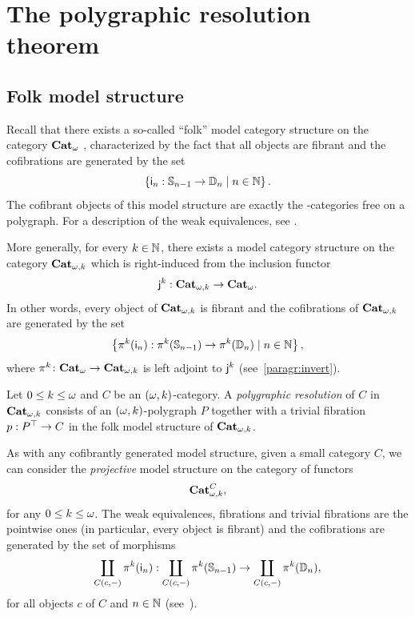 \section{The polygraphic resolution theorem}\label{sec:projresol}

\subsection{Folk model structure}
\begin{paragr}\label{paragr:folk}
  Recall that there exists a so-called ``folk'' model category
  structure on the category $\mathbf{Cat}_{\omega}$ \cite{lafontetal:folkms}, characterized by the fact that
  all objects are fibrant and the cofibrations are generated by the
  set 
  \[
    \left\{ \mathsf{i}_{n}:\mathbb{S}_{n-1} \to \mathbb{D}_{n} \; | \; n \in \mathbb N\right\}.
  \]
  The cofibrant objects of this model structure are exactly the
  \oo\nbd-categories free on a polygraph. For a description of the
  weak equivalences, see \cite[Theorem 6.19]{lafontetal:folkms}. 
\end{paragr}
\begin{paragr}
  More generally, for every $k \in \mathbb N$, there exists a model
  category structure on the category $\mathbf{Cat}_{\omega,k}$ \cite{ara_lucas:folmon} which is
  right-induced from the inclusion functor
  \[
    \mathsf{j}_{}^{k}:\mathbf{Cat}_{\omega,k} \to \mathbf{Cat}_{\omega}.
  \]
  In other words, every object of $\mathbf{Cat}_{\omega,k}$ is fibrant and the cofibrations of $\mathbf{Cat}_{\omega,k}$ are generated
  by the set 
  \[
    \left\{ \mathsf{\pi}_{}^{k}(\mathsf{i}_{n}):\mathsf{\pi}_{}^{k}(\mathbb{S}_{n-1}) \to \mathsf{\pi}_{}^{k}(\mathbb{D}_{n}) \; | \; n \in \mathbb N\right\},
  \]
  where $\mathsf{\pi}_{}^{k} \colon \mathbf{Cat}_{\omega} \to \mathbf{Cat}_{\omega,k}$ is left adjoint to
  $\mathsf{j}_{}^{k}$ (see~\cref{paragr:invert}).
\end{paragr}
\begin{definition}\label{def:respol}
  Let $0 \leq k\leq \omega$ and $C$ be an $(\omega,k)$-category. A {\em
  polygraphic resolution} of $C$ in $\mathbf{Cat}_{\omega,k}$ consists of an
$(\omega,k)$-polygraph $P$ together with a trivial fibration
$p:P^\top\to C$
in the folk model structure of $\mathbf{Cat}_{\omega,k}$.
\end{definition}
\begin{paragr}\label{paragr:projcof}
  As with any cofibrantly generated model structure, given a small
  category $C$, we can consider the \emph{projective} model structure
  on the category of functors
  \[
    \mathbf{Cat}_{\omega,k}^{C},
  \]
  for any $0 \leq k \leq \omega$. The weak equivalences, fibrations
  and trivial fibrations are the pointwise ones (in particular, every
  object is fibrant) and the cofibrations are generated by the set of
  morphisms
  \[
   \coprod_{C(c,-)}\mathsf{\pi}_{}^{k}(\mathsf{i}_{n}): \coprod_{C(c,-)}\mathsf{\pi}_{}^{k}(\mathbb{S}_{n-1}) \to \coprod_{C(c,-)}\mathsf{\pi}_{}^{k}(\mathbb{D}_{n}),
  \]
  for all objects $c$ of $C$ and $n \in \mathbb N$ (see~\cite[Theorem 11.6.1]{hirschhorn:modctl}).
\end{paragr}
